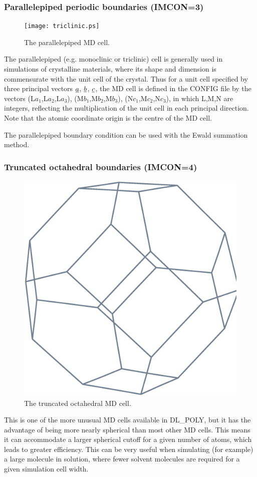 \subsubsection*{Parallelepiped periodic boundaries (IMCON=3)}

\begin{figure}[ht]
\begin{center}
\texttt{[image: triclinic.ps]}
\caption{The parallelepiped MD cell.}
\end{center}
\end{figure}

The parallelepiped (e.g. monoclinic or triclinic) cell is generally
used in simulations of crystalline materials, where its shape and
dimension is commensurate with the unit cell of the
crystal. Thus for a unit cell specified by three principal vectors
$\mbox{$\underline{a}$}$, $\mbox{$\underline{b}$}$, $\mbox{$\underline{c}$}$, the MD cell is defined in the \D{}
CONFIG file by the vectors (L$a_{1}$,L$a_{2}$,L$a_{3}$),
(M$b_{1}$,M$b_{2}$,M$b_{3}$), (N$c_{1}$,M$c_{2}$,N$c_{3}$), in which
L,M,N are integers, reflecting the multiplication of the unit cell in
each principal direction. Note that the atomic coordinate origin is
the centre of the MD cell.

The parallelepiped boundary condition can be used with the Ewald summation
method.

\subsubsection*{Truncated octahedral boundaries (IMCON=4)}

\begin{figure}[ht]
\begin{center}
\includegraphics[height=5 cm]{octa.ps}
\caption{The truncated octahedral MD cell.}
\end{center}
\end{figure}

This is one of the more unusual MD cells available in DL\_POLY, but it
has the advantage of being more nearly spherical than most other MD
cells. This means it can accommodate a larger spherical cutoff for a
given number of atoms, which leads to greater efficiency. This can be
very useful when simulating (for example) a large molecule in
solution, where fewer solvent molecules are required for a given
simulation cell width.

